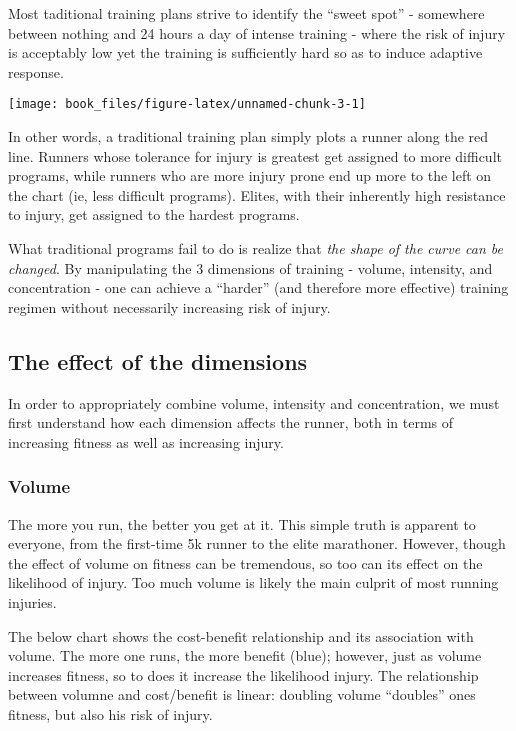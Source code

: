 \documentclass[]{tufte-handout}
\begin{document}
Most taditional training plans strive to identify the ``sweet spot'' -
somewhere between nothing and 24 hours a day of intense training - where
the risk of injury is acceptably low yet the training is sufficiently
hard so as to induce adaptive response.

\texttt{[image: book\_files/figure-latex/unnamed-chunk-3-1]}

In other words, a traditional training plan simply plots a runner along
the red line. Runners whose tolerance for injury is greatest get
assigned to more difficult programs, while runners who are more injury
prone end up more to the left on the chart (ie, less difficult
programs). Elites, with their inherently high resistance to injury, get
assigned to the hardest programs.

What traditional programs fail to do is realize that \emph{the shape of
the curve can be changed}. By manipulating the 3 dimensions of training
- volume, intensity, and concentration - one can achieve a ``harder''
(and therefore more effective) training regimen without necessarily
increasing risk of injury.

\subsection{The effect of the
dimensions}\label{the-effect-of-the-dimensions}

In order to appropriately combine volume, intensity and concentration,
we must first understand how each dimension affects the runner, both in
terms of increasing fitness as well as increasing injury.

\subsubsection{Volume}\label{volume}

The more you run, the better you get at it. This simple truth is
apparent to everyone, from the first-time 5k runner to the elite
marathoner. However, though the effect of volume on fitness can be
tremendous, so too can its effect on the likelihood of injury. Too much
volume is likely the main culprit of most running injuries.

The below chart shows the cost-benefit relationship and its association
with volume. The more one runs, the more benefit (blue); however, just
as volume increases fitness, so to does it increase the likelihood
injury. The relationship between volumne and cost/benefit is linear:
doubling volume ``doubles'' ones fitness, but also his risk of injury.
\end{document}
